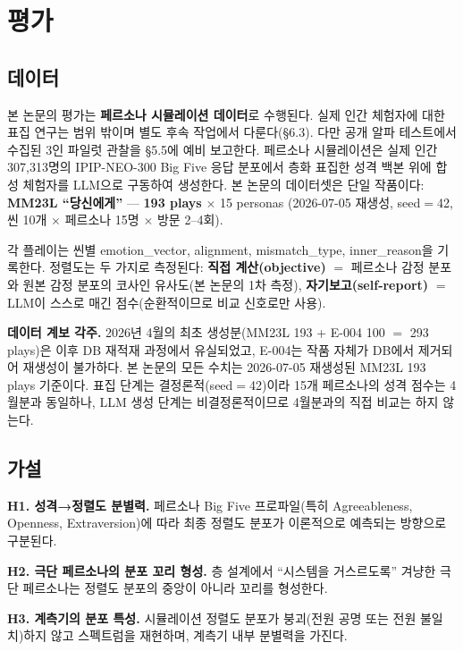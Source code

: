 \documentclass[11pt, a4paper]{article}
\begin{document}
\section{평가}

\subsection{데이터}
본 논문의 평가는 \textbf{페르소나 시뮬레이션 데이터}로 수행된다. 실제 인간 체험자에 대한 표집 연구는 범위 밖이며 별도 후속 작업에서 다룬다(\S6.3). 다만 공개 알파 테스트에서 수집된 3인 파일럿 관찰을 \S5.5에 예비 보고한다. 페르소나 시뮬레이션은 실제 인간 307{,}313명의 IPIP-NEO-300 Big Five 응답 분포에서 층화 표집한 성격 백본 위에 합성 체험자를 LLM으로 구동하여 생성한다. 본 논문의 데이터셋은 단일 작품이다: \textbf{MM23L ``당신에게''} --- \textbf{193 plays} $\times$ 15 personas (2026-07-05 재생성, seed$=$42, 씬 10개 $\times$ 페르소나 15명 $\times$ 방문 2--4회).

각 플레이는 씬별 emotion\_vector, alignment, mismatch\_type, inner\_reason을 기록한다. 정렬도는 두 가지로 측정된다: \textbf{직접 계산(objective)} $=$ 페르소나 감정 분포와 원본 감정 분포의 코사인 유사도(본 논문의 1차 측정), \textbf{자기보고(self-report)} $=$ LLM이 스스로 매긴 점수(순환적이므로 비교 신호로만 사용).

\noindent\textbf{데이터 계보 각주.} 2026년 4월의 최초 생성분(MM23L 193 + E-004 100 $=$ 293 plays)은 이후 DB 재적재 과정에서 유실되었고, E-004는 작품 자체가 DB에서 제거되어 재생성이 불가하다. 본 논문의 모든 수치는 2026-07-05 재생성된 MM23L 193 plays 기준이다. 표집 단계는 결정론적(seed$=$42)이라 15개 페르소나의 성격 점수는 4월분과 동일하나, LLM 생성 단계는 비결정론적이므로 4월분과의 직접 비교는 하지 않는다.

\subsection{가설}
\textbf{H1. 성격→정렬도 분별력.} 페르소나 Big Five 프로파일(특히 Agreeableness, Openness, Extraversion)에 따라 최종 정렬도 분포가 이론적으로 예측되는 방향으로 구분된다.

\textbf{H2. 극단 페르소나의 분포 꼬리 형성.} 층 설계에서 ``시스템을 거스르도록'' 겨냥한 극단 페르소나는 정렬도 분포의 중앙이 아니라 꼬리를 형성한다.

\textbf{H3. 계측기의 분포 특성.} 시뮬레이션 정렬도 분포가 붕괴(전원 공명 또는 전원 불일치)하지 않고 스펙트럼을 재현하며, 계측기 내부 분별력을 가진다.
\end{document}
